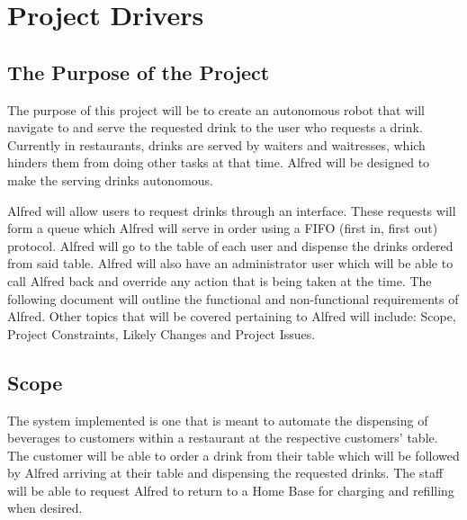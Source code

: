 \documentclass [11pt]{article}
\begin{document}
\pagebreak



\section {\textbf{Project Drivers}}

\subsection{The Purpose of the Project} 
The purpose of this project will be to create an autonomous robot that will navigate to and serve the requested drink to the user who requests a drink. Currently in restaurants, drinks are served by waiters and waitresses, which hinders them from doing other tasks at that time. Alfred will be designed to make the serving drinks autonomous. \newline

Alfred will allow users to request drinks through an interface. These requests will form a queue which Alfred will serve in order using a FIFO (first in, first out) protocol. Alfred will go to the table of each user and dispense the drinks ordered from said table. Alfred will also have an administrator user which will be able to call Alfred back and override any action that is being taken at the time. The following document will outline the functional and non-functional requirements of Alfred.  Other topics that will be covered pertaining to Alfred will include: Scope, Project Constraints, Likely Changes and Project Issues.

\subsection{Scope}
The system implemented is one that is meant to automate the dispensing of beverages to customers within a restaurant at the respective customers' table. The customer will be able to order a drink from their table which will be followed by Alfred arriving at their table and dispensing the requested drinks. The staff will be able to request Alfred to return to a Home Base for charging and refilling when desired. 
\end{document}
